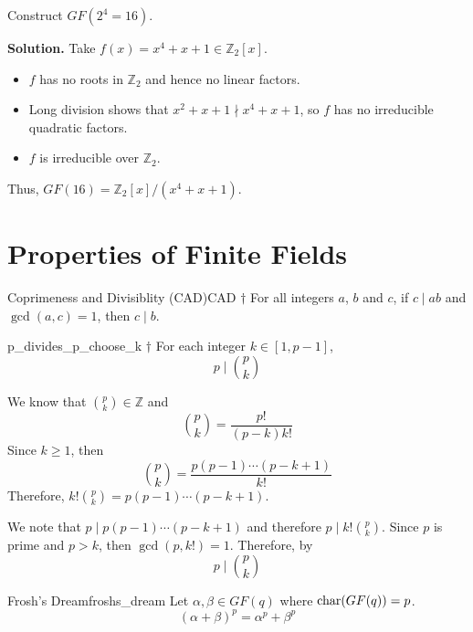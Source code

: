 
\begin{Example}{}{}
    Construct $ GF(2^4=16) $.

    \textbf{Solution.} Take $ f(x)=x^4+x+1\in\mathbb{Z}_2[x] $.
    \begin{itemize}
        \item $ f $ has no roots in $ \mathbb{Z}_2 $ and hence no linear factors.
        \item Long division shows that $ x^2+x+1\nmid x^4+x+1 $, so $ f $
              has no irreducible quadratic factors.
        \item $ f $ is irreducible over $ \mathbb{Z}_2 $.
    \end{itemize}
    Thus, $ GF(16)=\mathbb{Z}_2[x]/(x^4+x+1) $.
\end{Example}

\section{Properties of Finite Fields}

\begin{Proposition}{Coprimeness and Divisiblity (CAD)}{CAD}
    $ \dagger $ For all integers $ a $, $ b $ and $ c $, if $ c\mid ab $
    and $ \gcd(a,c)=1 $, then $ c\mid b $.
\end{Proposition}

\begin{Lemma}{}{p_divides_p_choose_k}
    $ \dagger $ For each integer $ k\in[1,p-1] $,
    \[ p\mid \binom{p}{k} \]
\end{Lemma}

\begin{Proof}{}{}
    We know that $ \binom{p}{k}\in\mathbb{Z} $ and
    \[ \binom{p}{k}=\frac{p!}{(p-k)k!} \]
    Since $ k\geqslant 1 $, then
    \[ \binom{p}{k}=\frac{p(p-1)\cdots(p-k+1)}{k!} \]
    Therefore, $ k!\binom{p}{k}=p(p-1)\cdots(p-k+1) $.

    We note that $ p\mid p(p-1)\cdots(p-k+1) $ and therefore
    $ p\mid k!\binom{p}{k} $. Since $ p $ is prime and $ p>k $,
    then $ \gcd(p,k!)=1 $. Therefore, by~
    \[ p\mid \binom{p}{k} \]
\end{Proof}

\begin{Theorem}{Frosh's Dream}{froshs_dream}
    Let $ \alpha,\beta\in GF(q) $ where $ \operatorname{char}(GF(q))=p $.
    \[ (\alpha + \beta)^p=\alpha^p+\beta^p \]
\end{Theorem}

